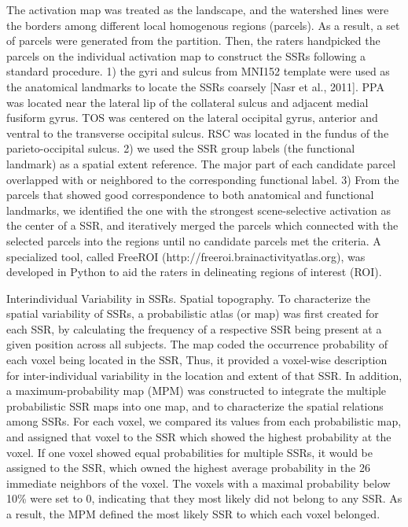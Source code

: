 %
The activation map was treated as the landscape, and the watershed lines were
the borders among different local homogenous regions (parcels).
%
As a result, a set of parcels were generated from the partition.
%
Then, the raters handpicked the parcels on the individual activation map to
construct the SSRs following a standard procedure.
%
1) the gyri and sulcus from MNI152 template were used as the anatomical
landmarks to locate the SSRs coarsely [Nasr et al., 2011].
%
PPA was located near the lateral lip of the collateral sulcus and adjacent
medial fusiform gyrus.
%
TOS was centered on the lateral occipital gyrus, anterior and ventral to the
transverse occipital sulcus.
%
RSC was located in the fundus of the parieto-occipital sulcus.
%
2) we used the SSR group labels (the functional landmark) as a spatial
extent reference.
%
The major part of each candidate parcel overlapped with or neighbored to the
corresponding functional label.
%
3) From the parcels that showed good correspondence to both anatomical and
functional landmarks, we identified the one with the strongest scene-selective
activation as the center of a SSR, and iteratively merged the parcels which
connected with the selected parcels into the regions until no candidate parcels
met the criteria.
%
A specialized tool, called FreeROI (http://freeroi.brainactivityatlas.org), was
developed in Python to aid the raters in delineating regions of interest (ROI).

Interindividual Variability in SSRs.
%
Spatial topography.
%
To characterize the spatial variability of SSRs, a probabilistic atlas (or map)
was first created for each SSR, by calculating the frequency of a respective SSR
being present at a given position across all subjects.
%
The map coded the occurrence probability of each voxel being located in the SSR,
%
Thus, it provided a voxel-wise description for inter-individual variability in
the location and extent of that SSR.
%
In addition, a maximum-probability map (MPM) was constructed to integrate the
multiple probabilistic SSR maps into one map, and to characterize the spatial
relations among SSRs.
%
For each voxel, we compared its values from each probabilistic
map, and assigned that voxel to the SSR which showed the highest probability at
the voxel.
%
If one voxel showed equal probabilities for multiple SSRs, it would be assigned
to the SSR, which owned the highest average probability in the 26 immediate
neighbors of the voxel.
%
The voxels with a maximal probability below 10\% were set to 0, indicating that
they most likely did not belong to any SSR.
%
As a result, the MPM defined the most likely SSR to which each voxel belonged.

